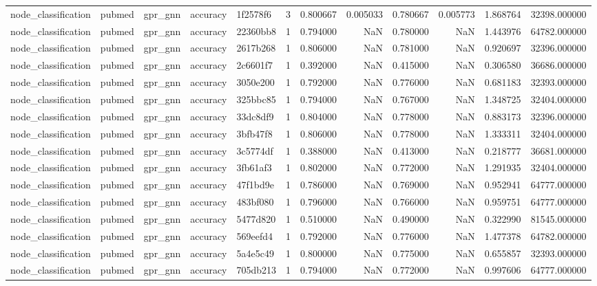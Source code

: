 \begin{tabular}{lllllrrrrrrr}
node_classification & pubmed & gpr_gnn & accuracy & 1f2578f6 & 3 & 0.800667 & 0.005033 & 0.780667 & 0.005773 & 1.868764 & 32398.000000 \\
node_classification & pubmed & gpr_gnn & accuracy & 22360bb8 & 1 & 0.794000 & NaN & 0.780000 & NaN & 1.443976 & 64782.000000 \\
node_classification & pubmed & gpr_gnn & accuracy & 2617b268 & 1 & 0.806000 & NaN & 0.781000 & NaN & 0.920697 & 32396.000000 \\
node_classification & pubmed & gpr_gnn & accuracy & 2c6601f7 & 1 & 0.392000 & NaN & 0.415000 & NaN & 0.306580 & 36686.000000 \\
node_classification & pubmed & gpr_gnn & accuracy & 3050e200 & 1 & 0.792000 & NaN & 0.776000 & NaN & 0.681183 & 32393.000000 \\
node_classification & pubmed & gpr_gnn & accuracy & 325bbc85 & 1 & 0.794000 & NaN & 0.767000 & NaN & 1.348725 & 32404.000000 \\
node_classification & pubmed & gpr_gnn & accuracy & 33dc8df9 & 1 & 0.804000 & NaN & 0.778000 & NaN & 0.883173 & 32396.000000 \\
node_classification & pubmed & gpr_gnn & accuracy & 3bfb47f8 & 1 & 0.806000 & NaN & 0.778000 & NaN & 1.333311 & 32404.000000 \\
node_classification & pubmed & gpr_gnn & accuracy & 3c5774df & 1 & 0.388000 & NaN & 0.413000 & NaN & 0.218777 & 36681.000000 \\
node_classification & pubmed & gpr_gnn & accuracy & 3fb61af3 & 1 & 0.802000 & NaN & 0.772000 & NaN & 1.291935 & 32404.000000 \\
node_classification & pubmed & gpr_gnn & accuracy & 47f1bd9e & 1 & 0.786000 & NaN & 0.769000 & NaN & 0.952941 & 64777.000000 \\
node_classification & pubmed & gpr_gnn & accuracy & 483bf080 & 1 & 0.796000 & NaN & 0.766000 & NaN & 0.959751 & 64777.000000 \\
node_classification & pubmed & gpr_gnn & accuracy & 5477d820 & 1 & 0.510000 & NaN & 0.490000 & NaN & 0.322990 & 81545.000000 \\
node_classification & pubmed & gpr_gnn & accuracy & 569eefd4 & 1 & 0.792000 & NaN & 0.776000 & NaN & 1.477378 & 64782.000000 \\
node_classification & pubmed & gpr_gnn & accuracy & 5a4e5c49 & 1 & 0.800000 & NaN & 0.775000 & NaN & 0.655857 & 32393.000000 \\
node_classification & pubmed & gpr_gnn & accuracy & 705db213 & 1 & 0.794000 & NaN & 0.772000 & NaN & 0.997606 & 64777.000000 \\

\end{tabular}
